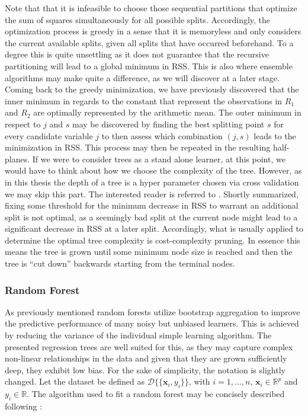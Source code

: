 \documentclass[a4paper,12pt, headsepline]{scrartcl}
\numberwithin{equation}{section}
\begin{document}
Note that that it is infeasible to choose those sequential partitions that optimize the sum of squares simultaneously for all possible splits. Accordingly, the optimization process is greedy in a sense that it is memoryless and only considers the current available splits, given all splits that have occurred beforehand. To a degree this is quite unsettling as it does not guarantee that the recursive partitioning will lead to a global minimum in RSS. This is also where ensemble algorithms may make quite a difference, as we will discover at a later stage. Coming back to the greedy minimization, we have previously discovered that the inner minimum in regards to the constant that represent the observations in $R_1$ and $R_2$ are optimally represented by the arithmetic mean. The outer minimum in respect to $j$ and $s$ may be discovered by  finding the best splitting point $s$ for every candidate variable $j$ to then assess which combination $(j, s)$ leads to the minimization in RSS. This process may then be repeated in the resulting half-planes. If we were to consider trees as a stand alone learner, at this point, we would have to think about how we choose the complexity of the tree. However, as in this thesis the depth of a tree is a hyper parameter chosen via cross validation we may skip this part. The interested reader is referred to \citet{hastie09}. Shortly summarized, fixing some threshold for the minimum decrease in RSS to warrant an additional split is not optimal, as a seemingly bad split at the current node  might lead to a significant decrease in RSS at a later split. Accordingly, what is usually applied to determine the optimal tree complexity is cost-complexity pruning. In essence this means the tree is grown until some minimum node size is reached and then the tree is \enquote{cut down} backwards starting from the terminal nodes.

\subsubsection{Random Forest}\label{subsubsec:rf}
As previously mentioned random forests utilize bootstrap aggregation to improve the predictive performance of many noisy but unbiased learners. This is achieved by reducing the variance of the individual simple learning algorithm. The presented regression trees are well suited for this, as they may capture complex non-linear relationships in the data and given that they are grown sufficiently deep, they exhibit low bias. For the sake of simplicity, the notation is slightly changed. Let the dataset be defined as $\mathcal{D}\{\{\bm x_i, y_i\}\}$, with $i = 1, ..., n$, $\bm x_i \in \mathbb{R}^p$ and $y_i \in \mathbb{R}$. The algorithm used to fit a random forest may be concisely described following \citet{hastie09}:
\end{document}
